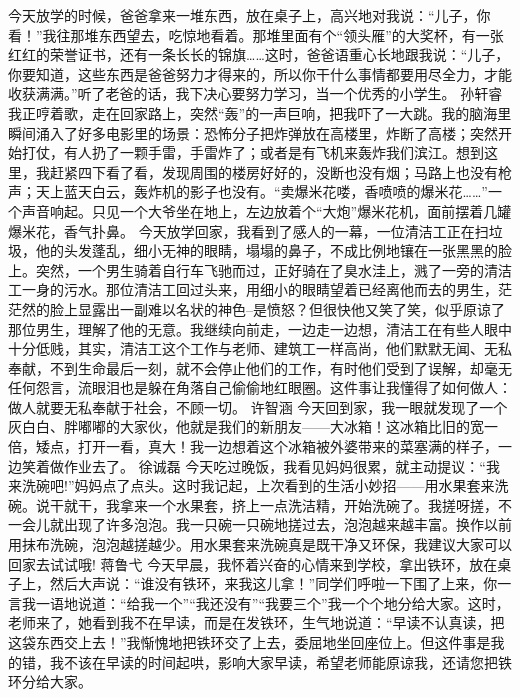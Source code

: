 {}今天放学的时候，爸爸拿来一堆东西，放在桌子上，高兴地对我说：“儿子，你看！”我往那堆东西望去，吃惊地看着。那堆里面有个“领头雁”的大奖杯，有一张红红的荣誉证书，还有一条长长的锦旗……这时，爸爸语重心长地跟我说：“儿子，你要知道，这些东西是爸爸努力才得来的，所以你干什么事情都要用尽全力，才能收获满满。”听了老爸的话，我下决心要努力学习，当一个优秀的小学生。\markdownRendererInterblockSeparator
{}\markdownRendererInterblockSeparator
{}孙轩睿\markdownRendererInterblockSeparator
{}我正哼着歌，走在回家路上，突然“轰”的一声巨响，把我吓了一大跳。我的脑海里瞬间涌入了好多电影里的场景：恐怖分子把炸弹放在高楼里，炸断了高楼；突然开始打仗，有人扔了一颗手雷，手雷炸了；或者是有飞机来轰炸我们滨江。想到这里，我赶紧四下看了看，发现周围的楼房好好的，没断也没有烟；马路上也没有枪声；天上蓝天白云，轰炸机的影子也没有。“卖爆米花喽，香喷喷的爆米花……”一个声音响起。只见一个大爷坐在地上，左边放着个“大炮”爆米花机，面前摆着几罐爆米花，香气扑鼻。\markdownRendererInterblockSeparator
{}\markdownRendererInterblockSeparator
{}今天放学回家，我看到了感人的一幕，一位清洁工正在扫垃圾，他的头发蓬乱，细小无神的眼睛，塌塌的鼻子，不成比例地镶在一张黑黑的脸上。突然，一个男生骑着自行车飞驰而过，正好骑在了臭水洼上，溅了一旁的清洁工一身的污水。那位清洁工回过头来，用细小的眼睛望着已经离他而去的男生，茫茫然的脸上显露出一副难以名状的神色--是愤怒？但很快他又笑了笑，似乎原谅了那位男生，理解了他的无意。我继续向前走，一边走一边想，清洁工在有些人眼中十分低贱，其实，清洁工这个工作与老师、建筑工一样高尚，他们默默无闻、无私奉献，不到生命最后一刻，就不会停止他们的工作，有时他们受到了误解，却毫无任何怨言，流眼泪也是躲在角落自己偷偷地红眼圈。这件事让我懂得了如何做人：做人就要无私奉献于社会，不顾一切。\markdownRendererInterblockSeparator
{}\markdownRendererInterblockSeparator
{}许智涵\markdownRendererInterblockSeparator
{}今天回到家，我一眼就发现了一个灰白白、胖嘟嘟的大家伙，他就是我们的新朋友——大冰箱！这冰箱比旧的宽一倍，矮点，打开一看，真大！我一边想着这个冰箱被外婆带来的菜塞满的样子，一边笑着做作业去了。\markdownRendererInterblockSeparator
{}\markdownRendererInterblockSeparator
{}徐诚磊\markdownRendererInterblockSeparator
{}今天吃过晚饭，我看见妈妈很累，就主动提议：“我来洗碗吧!”妈妈点了点头。这时我记起，上次看到的生活小妙招——用水果套来洗碗。说干就干，我拿来一个水果套，挤上一点洗洁精，开始洗碗了。我搓呀搓，不一会儿就出现了许多泡泡。我一只碗一只碗地搓过去，泡泡越来越丰富。换作以前用抹布洗碗，泡泡越搓越少。用水果套来洗碗真是既干净又环保，我建议大家可以回家去试试哦!\markdownRendererInterblockSeparator
{}\markdownRendererInterblockSeparator
{}蒋鲁弋\markdownRendererInterblockSeparator
{}今天早晨，我怀着兴奋的心情来到学校，拿出铁环，放在桌子上，然后大声说：“谁没有铁环，来我这儿拿！”同学们呼啦一下围了上来，你一言我一语地说道：“给我一个”“我还没有”“我要三个”\markdownRendererEllipsis{}\markdownRendererEllipsis{}我一个个地分给大家。这时，老师来了，她看到我不在早读，而是在发铁环，生气地说道：“早读不认真读，把这袋东西交上去！”我惭愧地把铁环交了上去，委屈地坐回座位上。但这件事是我的错，我不该在早读的时间起哄，影响大家早读，希望老师能原谅我，还请您把铁环分给大家。\relax